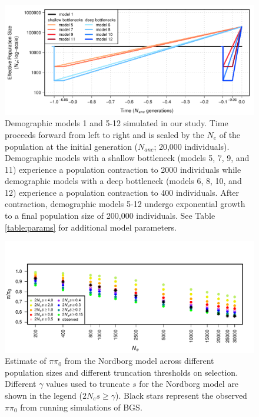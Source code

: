 \documentclass[9pt,twocolumn,twoside]{rilabRxiv}
\begin{document}
\begin{figure}[t]
\includegraphics[width=0.8\linewidth]{figures/FigS2.pdf}
\caption{Demographic models 1 and 5-12 simulated in our study.
Time proceeds forward from left to right and is scaled by the $N_e$ of the population at the initial generation ($N_{anc}$; 20,000 individuals).
Demographic models with a shallow bottleneck (models 5, 7, 9, and 11) experience a population contraction to 2000 individuals while demographic models with a deep bottleneck (models 6, 8, 10, and 12) experience a population contraction to 400 individuals.
After contraction, demographic models 5-12 undergo exponential growth to a final population size of 200,000 individuals.
See Table \ref{table:params} for additional model parameters.}
\label{fig:models2}
\end{figure}
\pagebreak

\begin{figure}[t]
\includegraphics[width=.9\linewidth]{figures/FigS21.pdf}
\caption{Estimate of $\pi\pi_0$ from the Nordborg model across different population sizes and different truncation thresholds on selection.
Different $\gamma$ values used to truncate $s$ for the Nordborg model are shown in the legend ($2N_es \geq \gamma$).
Black stars represent the observed $\pi\pi_0$ from running simulations of BGS.}
\label{fig:nordborgsims}
\end{figure}
\pagebreak
\end{document}
